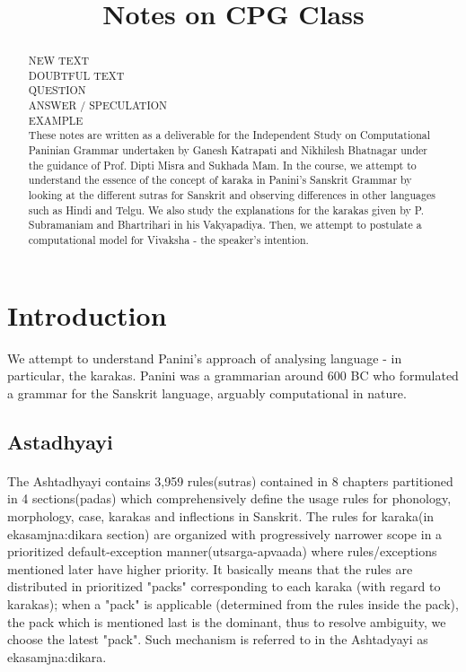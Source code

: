 \documentclass[a4paper,10pt]{article}
\title{Notes on CPG Class}
\author{}
\begin{document}
\maketitle

\newpage

\tableofcontents

\newpage

\begin{abstract}
\color{black!100}
NEW TEXT\\
\color{blue!100}
DOUBTFUL TEXT\\
\color{red!100}
QUESTION\\
\color{green!100}
ANSWER / SPECULATION\\
\color{purple!100}
EXAMPLE\\
\color{black!100}
These notes are written as a deliverable for the Independent Study on Computational Paninian Grammar undertaken by Ganesh Katrapati and Nikhilesh Bhatnagar under the guidance of Prof. Dipti Misra and Sukhada Mam. In the course, we attempt to understand the essence of the concept of karaka in Panini's Sanskrit Grammar by looking at the different sutras for Sanskrit and observing differences in other languages such as Hindi and Telgu. We also study the explanations for the karakas given by P. Subramaniam and Bhartrihari in his Vakyapadiya. Then, we attempt to postulate a computational model for Vivaksha - the speaker's intention.\\
\end{abstract}
\newpage
\section{Introduction}
\color{black!100}
We attempt to understand Panini's approach of analysing language - in particular, the karakas. Panini was a grammarian around 600 BC who formulated a grammar for the Sanskrit language, arguably computational in nature.
\subsection{Astadhyayi}
\paragraph{}The Ashtadhyayi contains 3,959 rules(sutras) contained in 8 chapters partitioned in 4 sections(padas) which comprehensively define the usage rules for phonology, morphology, case, karakas and inflections in Sanskrit. The rules for karaka(in ekasamjna:dikara section) are organized with progressively narrower scope in a prioritized default-exception manner(utsarga-apvaada) where rules/exceptions mentioned later have higher priority. It basically means that the rules are distributed in prioritized "packs" corresponding to each karaka (with regard to karakas); when a "pack" is applicable (determined from the rules inside the pack), the pack which is mentioned last is the dominant, thus to resolve ambiguity, we choose the latest "pack". Such mechanism is referred to in the Ashtadyayi as ekasamjna:dikara.
\end{document}
